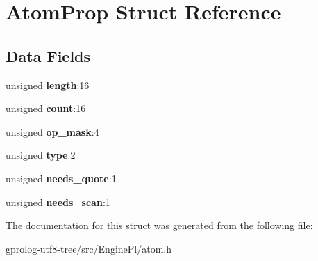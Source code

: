 \hypertarget{structAtomProp}{}\section{Atom\+Prop Struct Reference}
\label{structAtomProp}
\subsection*{Data Fields}
\begin{DoxyCompactItemize}
\item 
unsigned {\bfseries length}\+:16\hypertarget{structAtomProp_a5708a8e58126cdcd641e6c24e7dd429d}{}\label{structAtomProp_a5708a8e58126cdcd641e6c24e7dd429d}

\item 
unsigned {\bfseries count}\+:16\hypertarget{structAtomProp_a686f0165443645d420bfd7381ddfedb0}{}\label{structAtomProp_a686f0165443645d420bfd7381ddfedb0}

\item 
unsigned {\bfseries op\+\_\+mask}\+:4\hypertarget{structAtomProp_add308662f264e390f71e5557b97837c0}{}\label{structAtomProp_add308662f264e390f71e5557b97837c0}

\item 
unsigned {\bfseries type}\+:2\hypertarget{structAtomProp_accd017afa6f2854bb9316f492449c025}{}\label{structAtomProp_accd017afa6f2854bb9316f492449c025}

\item 
unsigned {\bfseries needs\+\_\+quote}\+:1\hypertarget{structAtomProp_a4b3fe8dfeb73dc67be63684028709774}{}\label{structAtomProp_a4b3fe8dfeb73dc67be63684028709774}

\item 
unsigned {\bfseries needs\+\_\+scan}\+:1\hypertarget{structAtomProp_ada3d42fc8a9d6e708de7db347444b6ee}{}\label{structAtomProp_ada3d42fc8a9d6e708de7db347444b6ee}

\end{DoxyCompactItemize}


The documentation for this struct was generated from the following file\+:\begin{DoxyCompactItemize}
\item 
gprolog-\/utf8-\/tree/src/\+Engine\+Pl/atom.\+h\end{DoxyCompactItemize}
